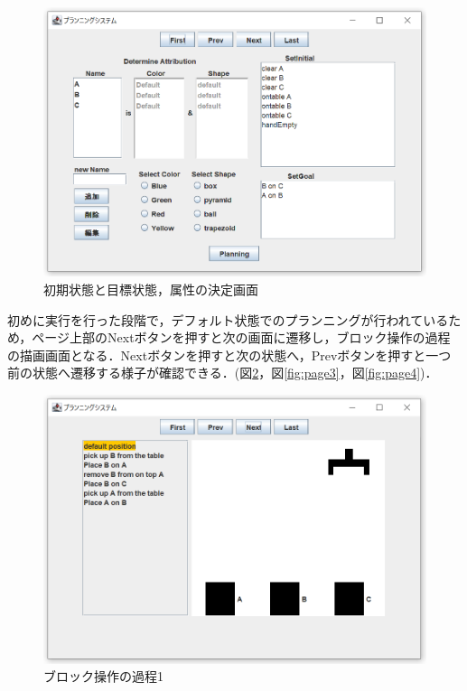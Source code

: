 \documentclass[12pt]{jarticle}
\begin{document}
\begin{figure}[htbp]
  \begin{center}
    \includegraphics[scale=0.6]{images/page1.PNG}
    \caption{初期状態と目標状態，属性の決定画面}
    \label{fig:page1}
  \end{center}
\end{figure}
\clearpage
初めに実行を行った段階で，デフォルト状態でのプランニングが行われているため，ページ上部のNextボタンを押すと次の画面に遷移し，ブロック操作の過程の描画画面となる．Nextボタンを押すと次の状態へ，Prevボタンを押すと一つ前の状態へ遷移する様子が確認できる．(図\ref{fig:page2}，図\ref{fig:page3}，図\ref{fig:page4})．\\
\begin{figure}[htbp]
  \begin{center}
    \includegraphics[scale=0.6]{images/page2.PNG}
    \caption{ブロック操作の過程1}
    \label{fig:page2}
  \end{center}
\end{figure}
\end{document}
